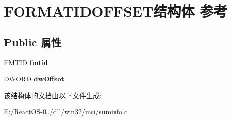 \hypertarget{struct_f_o_r_m_a_t_i_d_o_f_f_s_e_t}{}\section{F\+O\+R\+M\+A\+T\+I\+D\+O\+F\+F\+S\+E\+T结构体 参考}
\label{struct_f_o_r_m_a_t_i_d_o_f_f_s_e_t}
\subsection*{Public 属性}
\begin{DoxyCompactItemize}
\item 
\mbox{\label{struct_f_o_r_m_a_t_i_d_o_f_f_s_e_t_ae7d1a74a5e8b9ef2a6e228a9ee0eeef3}} 
\hyperlink{interface_g_u_i_d}{F\+M\+T\+ID} {\bfseries fmtid}
\item 
\mbox{\label{struct_f_o_r_m_a_t_i_d_o_f_f_s_e_t_af39b0bc0a7e768b89bc94ce29d120a1c}} 
D\+W\+O\+RD {\bfseries dw\+Offset}
\end{DoxyCompactItemize}


该结构体的文档由以下文件生成\+:\begin{DoxyCompactItemize}
\item 
E\+:/\+React\+O\+S-\/0../dll/win32/msi/suminfo.\+c\end{DoxyCompactItemize}
